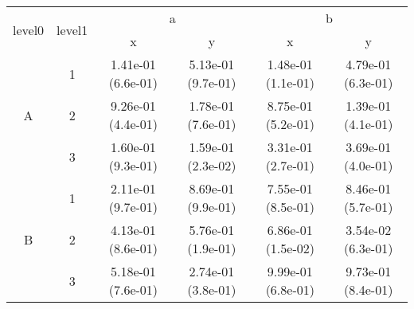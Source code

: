 \begin{tabular}{cccccc}
\toprule
\multirow{2}{*}{level0} & \multirow{2}{*}{level1}&\multicolumn{2}{c}{a}&\multicolumn{2}{c}{b}\tabularnewline
\cmidrule(lr){3-4}
\cmidrule(lr){5-6}
&&x&y&x&y\tabularnewline
\midrule
\multirow{3}{*}{A}&1& 1.41e-01 (6.6e-01)& 5.13e-01 (9.7e-01)& 1.48e-01 (1.1e-01)& 4.79e-01 (6.3e-01)\tabularnewline
&2& 9.26e-01 (4.4e-01)& 1.78e-01 (7.6e-01)& 8.75e-01 (5.2e-01)& 1.39e-01 (4.1e-01)\tabularnewline
&3& 1.60e-01 (9.3e-01)& 1.59e-01 (2.3e-02)& 3.31e-01 (2.7e-01)& 3.69e-01 (4.0e-01)\tabularnewline
\midrule
\multirow{3}{*}{B}&1& 2.11e-01 (9.7e-01)& 8.69e-01 (9.9e-01)& 7.55e-01 (8.5e-01)& 8.46e-01 (5.7e-01)\tabularnewline
&2& 4.13e-01 (8.6e-01)& 5.76e-01 (1.9e-01)& 6.86e-01 (1.5e-02)& 3.54e-02 (6.3e-01)\tabularnewline
&3& 5.18e-01 (7.6e-01)& 2.74e-01 (3.8e-01)& 9.99e-01 (6.8e-01)& 9.73e-01 (8.4e-01)\tabularnewline
\bottomrule
\end{tabular}
